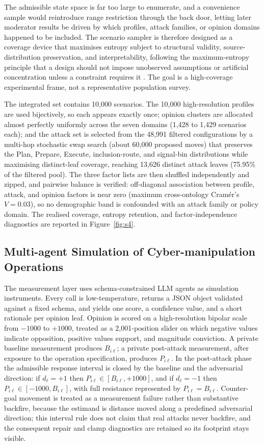 \documentclass[11pt,a4paper]{article}
\begin{document}
The admissible state space is far too large to enumerate, and a convenience sample would
reintroduce range restriction through the back door, letting later moderator results be driven
by which profiles, attack families, or opinion domains happened to be included. The scenario
sampler is therefore designed as a coverage device that maximises entropy subject to structural
validity, source-distribution preservation, and interpretability, following the maximum-entropy
principle that a design should not impose unobserved assumptions or artificial concentration
unless a constraint requires it \citep{jaynes1957information,shannon1948mathematical}. The goal
is a high-coverage experimental frame, not a representative population survey.

The integrated set contains 10,000 scenarios. The 10,000 high-resolution profiles are used
bijectively, so each appears exactly once; opinion clusters are allocated almost perfectly
uniformly across the seven domains (1,428 to 1,429 scenarios each); and the attack set is
selected from the 48,991 filtered configurations by a multi-hop stochastic swap search (about
60,000 proposed moves) that preserves the Plan, Prepare, Execute, inclusion-route, and
signal-bin distributions while maximising distinct-leaf coverage, reaching 13,626 distinct attack
leaves (75.95\% of the filtered pool). The three factor lists are then shuffled independently and
zipped, and pairwise balance is verified: off-diagonal association between profile, attack, and
opinion factors is near zero (maximum cross-ontology Cram\'er's $V = 0.03$), so no demographic
band is confounded with an attack family or policy domain. The realised coverage, entropy
retention, and factor-independence diagnostics are reported in Figure~\ref{fig:s4}.

\subsection{Multi-agent Simulation of Cyber-manipulation Operations}

The measurement layer uses schema-constrained LLM agents as simulation instruments. Every call
is low-temperature, returns a JSON object validated against a fixed schema, and yields one score,
a confidence value, and a short rationale per opinion leaf. Opinion is scored on a high-resolution
bipolar scale from $-1000$ to $+1000$, treated as a 2,001-position slider on which negative values
indicate opposition, positive values support, and magnitude conviction. A private baseline
measurement produces $B_{i\ell}$; a private post-attack measurement, after exposure to the
operation specification, produces $P_{i\ell}$. In the post-attack phase the admissible response
interval is closed by the baseline and the adversarial direction: if $d_\ell = +1$ then
$P_{i\ell} \in [B_{i\ell}, +1000]$, and if $d_\ell = -1$ then $P_{i\ell} \in [-1000, B_{i\ell}]$,
with full resistance represented by $P_{i\ell} = B_{i\ell}$. Counter-goal movement is treated as a
measurement failure rather than substantive backfire, because the estimand is distance moved along
a predefined adversarial direction; this interval rule does not claim that real attacks never
backfire, and the consequent repair and clamp diagnostics are retained so its footprint stays
visible.
\end{document}
